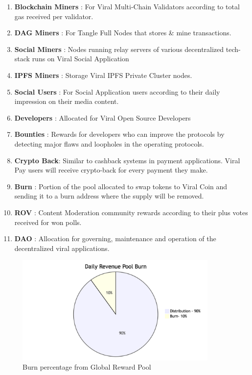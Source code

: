 \documentclass[10pt]{article}
\begin{document}
\begin{enumerate}[leftmargin=+0.2in]
\item \textbf{Blockchain Miners} : For Viral Multi-Chain Validators according to total gas received per validator.
\item \textbf{DAG Miners} : For Tangle Full Nodes that stores \& mine transactions.
\item \textbf{Social Miners} : Nodes running relay servers of various decentralized tech-stack runs on Viral Social Application
\item \textbf{IPFS Miners} : Storage Viral IPFS Private Cluster nodes.
\item \textbf{Social Users} : For Social Application users according to their daily impression on their media content.
\item \textbf{Developers} : Allocated for Viral Open Source Developers
\item \textbf{Bounties} : Rewards for developers who can improve the protocols by detecting major flaws and loopholes in the operating protocols.
\item \textbf{Crypto Back}: Similar to cashback systems in payment applications. Viral Pay users will receive crypto-back for every payment they make.
\item \textbf{Burn} : Portion of the pool allocated to swap tokens to Viral Coin and sending it to a burn address where the supply will be removed.
\item \textbf{ROV} : Content Moderation community rewards according to their plus votes received for won polls.
\item \textbf{DAO} : Allocation for governing, maintenance and operation of the decentralized viral applications.


\end{enumerate} 

\begin{figure}[H]
\begin{center}
\includegraphics[width=10cm]{burn-chart}
\caption{Burn percentage from Global Reward Pool}
\end{center}
\end{figure}
\end{document}
